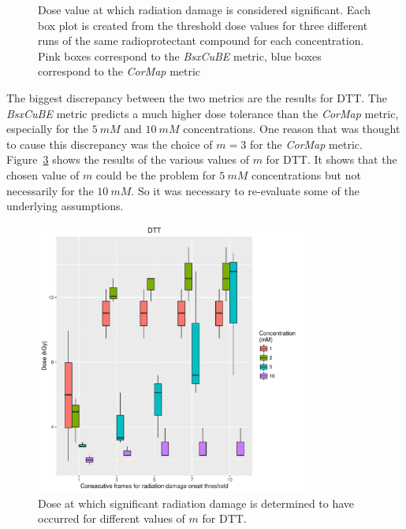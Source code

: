 \begin{figure}
\begin{subfigure}[b]{0.45\textwidth}
            \caption{}
            \label{fig:SAXS Metric comparison - 10mM}
    \end{subfigure}
    \caption{Dose value at which radiation damage is considered significant. Each box plot is created from the threshold dose values for three different runs of the same radioprotectant compound for each concentration. Pink boxes correspond to the \textit{BsxCuBE} metric, blue boxes correspond to the \textit{CorMap} metric}
    \label{fig:SAXS Metric comparison}
\end{figure}

The biggest discrepancy between the two metrics are the results for DTT.
The \textit{BsxCuBE} metric predicts a much higher dose tolerance than the \textit{CorMap} metric, especially for the $5\ mM$ and $10\ mM$ concentrations.
One reason that was thought to cause this discrepancy was the choice of $m = 3$ for the \textit{CorMap} metric.
Figure~\ref{fig:Num consec frames - DTT} shows the results of the various values of $m$ for DTT.
It shows that the chosen value of $m$ could be the problem for $5\ mM$ concentrations but not necessarily for the $10\ mM$.
So it was necessary to re-evaluate some of the underlying assumptions.
\begin{figure}
    \centering
    \includegraphics[width=0.8\textwidth]{figures/saxs/DTT_Num_consec_fr_comp.pdf}
    \caption{Dose at which significant radiation damage is determined to have occurred for different values of $m$ for DTT.}
    \label{fig:Num consec frames - DTT}
\end{figure}

